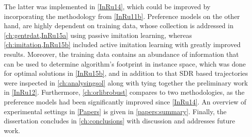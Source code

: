 The latter was implemented in \cref{InRu14}, which could be improved by 
incorporating the methodology from \cref{InRu11b}.
Preference models on  the other hand, are highly dependent on training data, 
whose collection is addressed in \cref{ch:gentrdat,InRu15a} using passive 
imitation learning, whereas \cref{ch:imitation,InRu15b} included active 
imitation learning with greatly improved results. 
Moreover, the training data contains an abundance of information that can be 
used to determine algorithm's footprint in instance space, which was done for 
optimal solutions in \cref{InRu15b}, and in addition to that SDR based 
trajectories were inspected in \cref{ch:analysingsol} along with tying together 
the preliminary work in \cref{InRu12}. 
Furthermore, \cref{ch:orlibrobust} compares to two methodologies, as the 
preference models had been significantly improved since \cref{InRu14}.
An overview of experimental settings in \cref{Papers} is given in 
\cref{papers:summary}. Finally, the dissertation concludes in 
\cref{ch:conclusions} with discussion and addresses future work.
    

